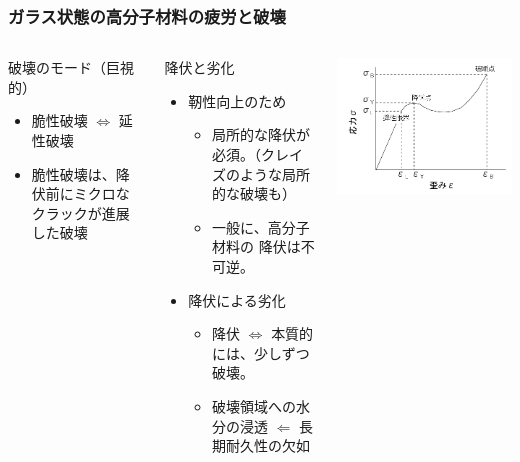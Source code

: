 \documentclass[aspectratio=169,11pt, dvipdfmx]{beamer}
\begin{document}
\begin{frame}
	\frametitle{ガラス状態の高分子材料の疲労と破壊}
		\begin{columns}[totalwidth=1\textwidth]
				\begin{block}{破壊のモード（巨視的）}
                    \begin{itemize}
                        \item 脆性破壊 $\Leftrightarrow$ 延性破壊
                        \item 脆性破壊は、降伏前にミクロなクラックが進展した破壊
                    \end{itemize}
				\end{block}
                \begin{exampleblock}{降伏と劣化}
                    \begin{itemize}
                        \item 靭性向上のため
                        \begin{itemize}
                            \item {\color{red} 局所的な降伏}が必須。（クレイズのような局所的な破壊も）
                            \item 一般に、高分子材料の{\color{red} 降伏は不可逆}。
                        \end{itemize}
                        \item 降伏による劣化
                            \begin{itemize}
                                \item 降伏 $\Leftrightarrow$ {\color{red} 本質的には、少しずつ破壊。}
                                \item {\color{red} 破壊領域への水分の浸透 $\Leftarrow$ 長期耐久性の欠如}
                            \end{itemize}
                    \end{itemize}
                \end{exampleblock}
				\includegraphics[width=\textwidth]{S_S_Curve.png}
		\end{columns}
\end{frame}
\end{document}
